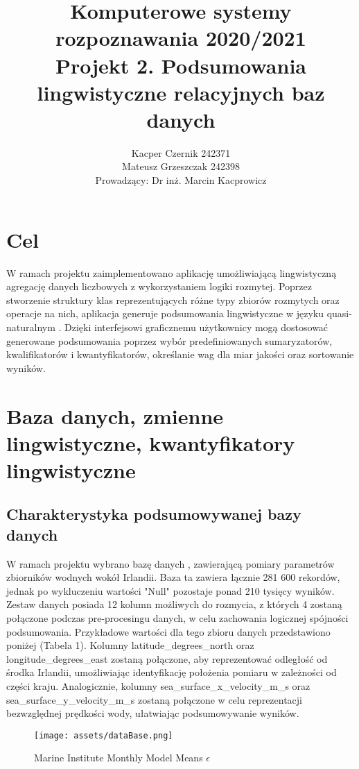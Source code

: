 \documentclass{article}
\author{
	{Kacper Czernik 242371} \\
	{Mateusz Grzeszczak 242398}\\
{Prowadzący: Dr inż. Marcin Kacprowicz }
}
\title{Komputerowe systemy rozpoznawania 2020/2021\\Projekt 2. Podsumowania lingwistyczne relacyjnych baz danych}
\begin{document}
\maketitle

\section{Cel}
W ramach projektu zaimplementowano aplikację umożliwiającą lingwistyczną agregację danych liczbowych z wykorzystaniem logiki rozmytej. Poprzez stworzenie struktury klas reprezentujących różne typy zbiorów rozmytych oraz operacje na nich, aplikacja generuje podsumowania lingwistyczne w języku quasi-naturalnym \cite{zadrozny06}. Dzięki interfejsowi graficznemu użytkownicy mogą dostosować generowane podsumowania poprzez wybór predefiniowanych sumaryzatorów, kwalifikatorów i kwantyfikatorów, określanie wag dla miar jakości oraz sortowanie wyników.\\

\section{Baza danych, zmienne lingwistyczne, kwantyfikatory lingwistyczne}

\subsection{Charakterystyka podsumowywanej bazy danych}

W ramach projektu wybrano bazę danych \cite{dataBase}, zawierającą pomiary parametrów zbiorników wodnych wokół Irlandii. Baza ta zawiera łącznie 281 600 rekordów, jednak po wykluczeniu wartości "Null"  pozostaje ponad 210 tysięcy wyników. Zestaw danych posiada 12 kolumn możliwych do rozmycia, z których 4 zostaną połączone podczas pre-procesingu danych, w celu zachowania logicznej spójności podsumowania. Przykładowe wartości dla tego zbioru danych przedstawiono poniżej (Tabela 1). Kolumny latitude\_degrees\_north oraz longitude\_degrees\_east zostaną połączone, aby reprezentować odległość od środka Irlandii, umożliwiając identyfikację położenia pomiaru w zależności od części kraju. Analogicznie, kolumny sea\_surface\_x\_velocity\_m\_s oraz \\sea\_surface\_y\_velocity\_m\_s zostaną połączone w celu reprezentacji bezwzględnej prędkości wody, ułatwiając podsumowywanie wyników.

\begin{figure}[H]
\centering
\texttt{[image: assets/dataBase.png]}
\caption{Marine Institute Monthly Model Means $\epsilon$}
\label{fig:epsilon_bat}
\end{figure}
\end{document}

